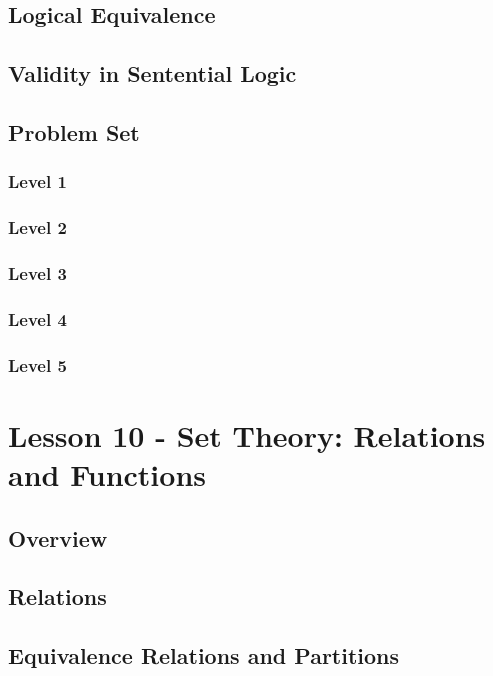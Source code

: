 \documentclass{article}
\begin{document}
\subsection{Logical Equivalence}
\begin{theorem}
\end{theorem}
\begin{theorem}
\end{theorem}
\begin{theorem}
\end{theorem}
\begin{theorem}
\subsection{Validity in Sentential Logic}
\subsection{Problem Set}
\subsubsection{Level 1}
\subsubsection{Level 2}
\subsubsection{Level 3}
\subsubsection{Level 4}
\subsubsection{Level 5}
\pagebreak

\section{Lesson 10 - Set Theory: Relations and Functions}
\subsection{Overview}
\subsection{Relations}
\subsection{Equivalence Relations and Partitions}

\end{theorem}
\end{document}
